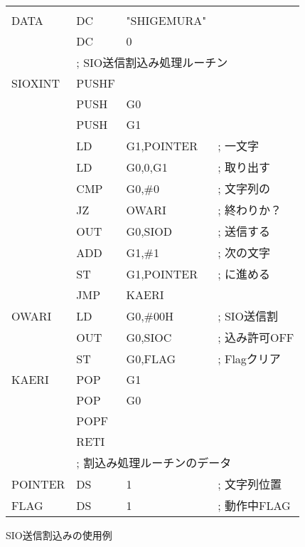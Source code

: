 \begin{figure}[btp]
{\begin{center}
\begin{tabular}{|l|l l l|}
        &       &                    &                   \\
DATA    & DC    & "SHIGEMURA"        &                   \\
        & DC    & 0                  &                   \\
        & \multicolumn{3}{|l|}{; SIO送信割込み処理ルーチン}\\
SIOXINT & PUSHF &                    &                   \\
        & PUSH  & G0                 &                   \\
        & PUSH  & G1                 &                   \\
        & LD    & G1,POINTER         & ; 一文字          \\
        & LD    & G0,0,G1            & ; 取り出す        \\
        & CMP   & G0,\#0             & ; 文字列の        \\
        & JZ    & OWARI              & ; 終わりか？      \\
        & OUT   & G0,SIOD            & ; 送信する        \\
        & ADD   & G1,\#1             & ; 次の文字        \\
        & ST    & G1,POINTER         & ; に進める        \\
        & JMP   & KAERI              &                   \\
OWARI   & LD    & G0,\#00H           & ; SIO送信割       \\
        & OUT   & G0,SIOC            & ; 込み許可OFF     \\
        & ST    & G0,FLAG            & ; Flagクリア      \\
KAERI   & POP   & G1                 &                   \\
        & POP   & G0                 &                   \\
        & POPF  &                    &                   \\
        & RETI  &                    &                   \\
        & \multicolumn{3}{|l|}{; 割込み処理ルーチンのデータ} \\
POINTER & DS    & 1                  & ; 文字列位置      \\
FLAG    & DS    & 1                  & ; 動作中FLAG    \\
\hline
\end{tabular}
\end{center}}
\caption{SIO送信割込みの使用例}
\label{fig:chap6:sioout}
\end{figure}

